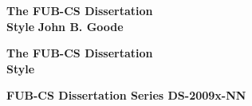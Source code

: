 {\pagestyle{empty}
\newcommand{\printtitle}{%
{\Huge\bf The FUB-CS Dissertation\\[0.8cm] Style}}    %

\begin{titlepage}
\par\vskip 2cm
\begin{center}
\printtitle
\vfill
{\LARGE\bf John B. Goode}                           %
\vskip 2cm
\end{center}
\end{titlepage}
%
%

\mbox{}\newpage
\setcounter{page}{1}

\par\vskip 2cm
\begin{center}
\printtitle
\end{center}

\clearpage
\par\vskip 2cm
\begin{center}
\par\vspace {1cm}
\fubcslogo{10cm}
\par\vspace {2cm}
\textbf{FUB-CS Dissertation Series DS-2009x-NN}   %
\par\vspace {7cm}
\noindent%


\end{center}}
